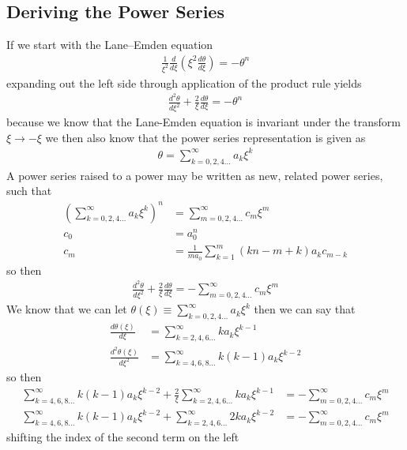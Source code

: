\subsection{Deriving the Power Series}
If we start with the Lane--Emden equation
\begin{align*}
    \frac{1}{\xi^{2}}\frac{d}{d\xi}\left(\xi^{2}\frac{d\theta}{d\xi}\right) = -\theta^{n}
\end{align*}
expanding out the left side through application of the product rule yields
\begin{align*}
    \frac{d^{2}\theta}{d\xi^{2}} + \frac{2}{\xi}\frac{d\theta}{d\xi} = -\theta^n
\end{align*}
because we know that the Lane-Emden equation is invariant under the transform $\xi\rightarrow-\xi$ we then also know that the power series representation is given as
\begin{align*}
    \theta = \sum_{k=0,2,4...}^{\infty}a_{k}\xi^{k}
\end{align*}
A power series raised to a power may be written as new, related power series, such that
\begin{align*}
    \left(\sum_{k=0,2,4...}^{\infty}a_{k}\xi^{k}\right)^{n} &= \sum_{m=0,2,4...}^{\infty}c_{m}\xi^{m} \\
    c_{0} &= a_{0}^{n} \\
    c_{m} &= \frac{1}{ma_{0}}\sum_{k=1}^{m}(kn-m+k)a_{k}c_{m-k}
\end{align*}
so then
\begin{align*}
    \frac{d^{2}\theta}{d\xi^{2}} + \frac{2}{\xi}\frac{d\theta}{d\xi} = -\sum_{m=0,2,4...}^{\infty}c_{m}\xi^{m}
\end{align*}
We know that we can let $\theta(\xi) \equiv \sum_{k=0,2,4...}^{\infty}a_{k}\xi^{k}$ then we can say that \begin{align*}
    \frac{d\theta(\xi)}{d\xi} &= \sum_{k=2,4,6...}^{\infty}ka_{k}\xi^{k-1} \\
    \frac{d^{2}\theta(\xi)}{d\xi^{2}} &= \sum_{k=4,6, 8...}^{\infty}k(k-1)a_{k}\xi^{k-2}
\end{align*}
so then
\begin{align*}
    \sum_{k=4,6,8...}^{\infty}k(k-1)a_{k}\xi^{k-2} + \frac{2}{\xi}\sum_{k=2,4,6...}^{\infty}ka_{k}\xi^{k-1} &= -\sum_{m=0, 2, 4...}^{\infty}c_{m}\xi^{m} \\
    \sum_{k=4,6,8...}^{\infty}k(k-1)a_{k}\xi^{k-2} + \sum_{k=2,4,6...}^{\infty}2ka_{k}\xi^{k-2} &= -\sum_{m=0,2,4...}^{\infty}c_{m}\xi^{m}
\end{align*}
shifting the index of the second term on the left
